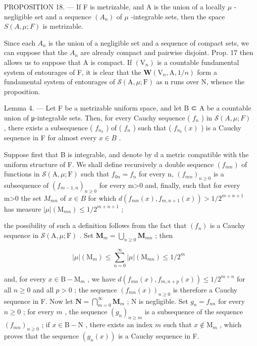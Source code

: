 PROPOSITION 18. --- If F is metrizable, and A is the union of a locally \(\mu\) -negligible set and a sequence \((A_{n})\) of \(\mu\) -integrable sets, then the space \(S(A,\mu;F)\) is metrizable.

Since each \(A_{n}\) is the union of a negligible set and a sequence of compact sets, we can suppose that the \(A_{n}\) are already compact and pairwise disjoint. Prop. 17 then allows us to suppose that A is compact. If \((\mathrm{V}_{n})\) is a countable fundamental system of entourages of F, it is clear that the \(\boldsymbol{W}(\mathrm{V}_{n},\mathrm{A},1/n)\) form a fundamental system of entourages of \(\mathcal{S}(\mathrm{A},\mu;\mathrm{F})\) as n runs over N, whence the proposition.

Lemma 4. --- Let F be a metrizable uniform space, and let B ⊂ A be a countable union of μ-integrable sets. Then, for every Cauchy sequence ( \(f_{n}\) ) in \(\mathcal{S}(A,\mu;F)\) , there exists a subsequence ( \(f_{n_{k}}\) ) of ( \(f_{n}\) ) such that ( \(f_{n_{k}}(x)\) ) is a Cauchy sequence in F for almost every \(x \in B\) .

Suppose first that B is integrable, and denote by d a metric compatible with the uniform structure of F. We shall define recursively a double sequence \((f_{mn})\) of functions in \(\mathcal{S}(\mathrm{A},\mu;\mathrm{F})\) such that \(f_{0n}=f_{n}\) for every n, \((f_{mn})_{n\geqslant0}\) is a subsequence of \((f_{m-1,n})_{n\geqslant0}\) for every m\textgreater0 and, finally, such that for every m\textgreater0 the set \(M_{mn}\) of \(x\in B\) for which \(d(f_{mn}(x),f_{m,n+1}(x))>1/2^{m+n+1}\) has measure \(|\mu|(\mathrm{M}_{mn})\leqslant1/2^{m+n+1}\) ;

the possibility of such a definition follows from the fact that \((f_n)\) is a Cauchy sequence in \(\mathcal{S}(\mathrm{A},\mu ;\mathrm{F})\) . Set \(\mathbf{M}_m = \bigcup_{n\geqslant 0}\mathbf{M}_{mn}\) ; then

\[
| \mu | (\mathrm{M} _ {m}) \leqslant \sum_ {n = 0} ^ {\infty} | \mu | (\mathrm{M} _ {m n}) \leqslant 1 / 2 ^ {m}
\]

and, for every \(x \in \mathrm{B} - \mathrm{M}_m\) , we have \(d(f_{mn}(x), f_{m,n+p}(x)) \leqslant 1/2^{m+n}\) for all \(n \geqslant 0\) and all \(p > 0\) ; the sequence \((f_{mn}(x))_{n \geqslant 0}\) is therefore a Cauchy sequence in F. Now let \(\mathbf{N} = \bigcap_{m=0}^{\infty} \mathbf{M}_m\) ; N is negligible. Set \(g_n = f_{nn}\) for every \(n \geqslant 0\) ; for every \(m\) , the sequence \((g_n)_{n \geqslant m}\) is a subsequence of the sequence \((f_{mn})_{n \geqslant 0}\) ; if \(x \in \mathrm{B} - \mathrm{N}\) , there exists an index \(m\) such that \(x \notin \mathrm{M}_m\) , which proves that the sequence \((g_n(x))\) is a Cauchy sequence in F.

